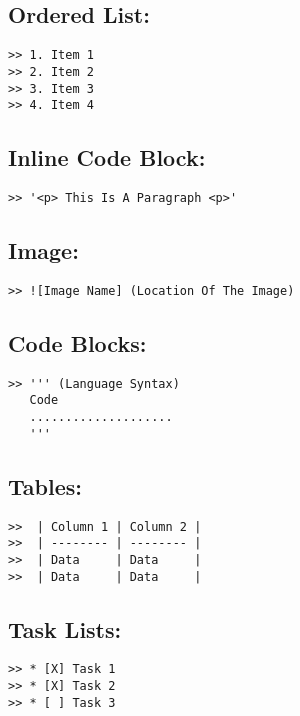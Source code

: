 \documentclass[12pt,british]{article}
\begin{document}
\subsection{Ordered List:}
\begin{verbatim}
>> 1. Item 1
>> 2. Item 2
>> 3. Item 3
>> 4. Item 4
\end{verbatim}

\subsection{Inline Code Block:}
\begin{verbatim}
>> '<p> This Is A Paragraph <p>'
\end{verbatim}

\subsection{Image:}
\begin{verbatim}
>> ![Image Name] (Location Of The Image)
\end{verbatim}

\subsection{Code Blocks:}
\begin{verbatim}
>> ''' (Language Syntax)
   Code 
   ....................
   '''
\end{verbatim}

\subsection{Tables:}
\begin{verbatim}
>>  | Column 1 | Column 2 |
>>  | -------- | -------- |
>>  | Data     | Data     |
>>  | Data     | Data     |
\end{verbatim}

\subsection{Task Lists:}
\begin{verbatim}
>> * [X] Task 1
>> * [X] Task 2
>> * [ ] Task 3
\end{verbatim}
\end{document}
